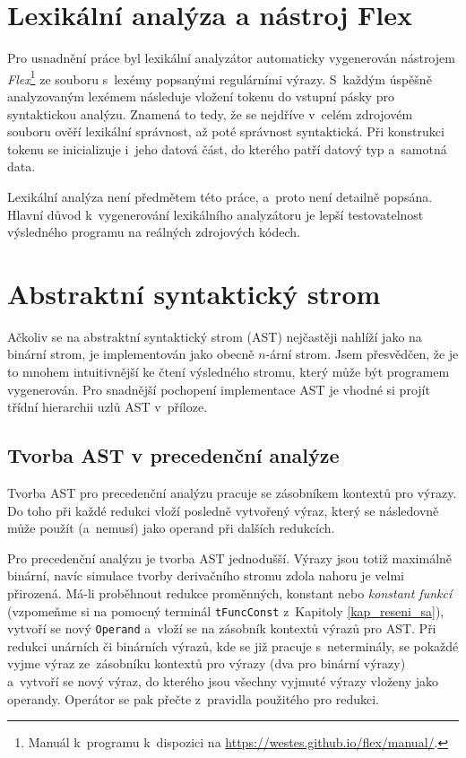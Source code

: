 \section{Lexikální analýza a nástroj Flex}
Pro usnadnění práce byl lexikální analyzátor automaticky vygenerován nástrojem \emph{Flex}\footnote{Manuál k~programu k~dispozici na \href{https://westes.github.io/flex/manual/}{https://westes.github.io/flex/manual/}.} ze souboru s~lexémy popsanými regulárními výrazy.
S~každým úspěšně analyzovaným lexémem následuje vložení tokenu do vstupní pásky pro syntaktickou analýzu.
Znamená to tedy, že se nejdříve v~celém zdrojovém souboru ověří lexikální správnost, až poté správnost syntaktická. 
Při konstrukci tokenu se inicializuje i~jeho datová část, do kterého patří datový typ a~samotná data.

Lexikální analýza není předmětem této práce, a~proto není detailně popsána.
Hlavní důvod k~vygenerování lexikálního analyzátoru je lepší testovatelnost výsledného programu na reálných zdrojových kódech.

\section{Abstraktní syntaktický strom}
Ačkoliv se na abstraktní syntaktický strom (AST) nejčastěji nahlíží jako na binární strom, je implementován jako obecně $n$-ární strom.
Jsem přesvědčen, že je to mnohem intuitivnější ke čtení výsledného stromu, který může být programem vygenerován.
Pro snadnější pochopení implementace AST je vhodné si projít třídní hierarchii uzlů AST v~příloze. 

\subsection*{Tvorba AST v precedenční analýze}
Tvorba AST pro precedenční analýzu pracuje se zásobníkem kontextů pro výrazy.
Do toho při každé redukci vloží posledně vytvořený výraz, který se následovně může použít (a~nemusí) jako operand při dalších redukcích.

Pro precedenční analýzu je tvorba AST jednodušší.
Výrazy jsou totiž maximálně binární, navíc simulace tvorby derivačního stromu zdola nahoru je velmi přirozená.
Má-li proběhnout redukce proměnných, konstant nebo \emph{konstant funkcí} (vzpomeňme si na pomocný terminál \texttt{tFuncConst} z~Kapitoly \ref{kap_reseni_sa}), vytvoří se nový \texttt{Operand} a~vloží se na zásobník kontextů výrazů pro AST.
Při redukci unárních či binárních výrazů, kde se již pracuje s~neterminály, se pokaždé vyjme výraz ze~zásobníku kontextů pro výrazy (dva pro binární výrazy) a~vytvoří se nový výraz, do kterého jsou všechny vyjmuté výrazy vloženy jako operandy.
Operátor se pak přečte z~pravidla použitého pro redukci.

